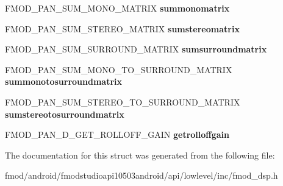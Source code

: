 \begin{DoxyCompactItemize}
\item 
\hypertarget{struct_f_m_o_d___d_s_p___s_t_a_t_e___p_a_n___c_a_l_l_b_a_c_k_s_a4374ff0e37febab077ced5562ed1fd0e}{F\+M\+O\+D\+\_\+\+P\+A\+N\+\_\+\+S\+U\+M\+\_\+\+M\+O\+N\+O\+\_\+\+M\+A\+T\+R\+I\+X {\bfseries summonomatrix}}\label{struct_f_m_o_d___d_s_p___s_t_a_t_e___p_a_n___c_a_l_l_b_a_c_k_s_a4374ff0e37febab077ced5562ed1fd0e}

\item 
\hypertarget{struct_f_m_o_d___d_s_p___s_t_a_t_e___p_a_n___c_a_l_l_b_a_c_k_s_a7c312689cc02bededfe55af6bf9e659b}{F\+M\+O\+D\+\_\+\+P\+A\+N\+\_\+\+S\+U\+M\+\_\+\+S\+T\+E\+R\+E\+O\+\_\+\+M\+A\+T\+R\+I\+X {\bfseries sumstereomatrix}}\label{struct_f_m_o_d___d_s_p___s_t_a_t_e___p_a_n___c_a_l_l_b_a_c_k_s_a7c312689cc02bededfe55af6bf9e659b}

\item 
\hypertarget{struct_f_m_o_d___d_s_p___s_t_a_t_e___p_a_n___c_a_l_l_b_a_c_k_s_a7bdde7169ce66b257d3150b7eb3847f8}{F\+M\+O\+D\+\_\+\+P\+A\+N\+\_\+\+S\+U\+M\+\_\+\+S\+U\+R\+R\+O\+U\+N\+D\+\_\+\+M\+A\+T\+R\+I\+X {\bfseries sumsurroundmatrix}}\label{struct_f_m_o_d___d_s_p___s_t_a_t_e___p_a_n___c_a_l_l_b_a_c_k_s_a7bdde7169ce66b257d3150b7eb3847f8}

\item 
\hypertarget{struct_f_m_o_d___d_s_p___s_t_a_t_e___p_a_n___c_a_l_l_b_a_c_k_s_afaed136e2108c6fde84bac606e9c66d8}{F\+M\+O\+D\+\_\+\+P\+A\+N\+\_\+\+S\+U\+M\+\_\+\+M\+O\+N\+O\+\_\+\+T\+O\+\_\+\+S\+U\+R\+R\+O\+U\+N\+D\+\_\+\+M\+A\+T\+R\+I\+X {\bfseries summonotosurroundmatrix}}\label{struct_f_m_o_d___d_s_p___s_t_a_t_e___p_a_n___c_a_l_l_b_a_c_k_s_afaed136e2108c6fde84bac606e9c66d8}

\item 
\hypertarget{struct_f_m_o_d___d_s_p___s_t_a_t_e___p_a_n___c_a_l_l_b_a_c_k_s_ab1858d5a0fa804e24a62363d0236d44a}{F\+M\+O\+D\+\_\+\+P\+A\+N\+\_\+\+S\+U\+M\+\_\+\+S\+T\+E\+R\+E\+O\+\_\+\+T\+O\+\_\+\+S\+U\+R\+R\+O\+U\+N\+D\+\_\+\+M\+A\+T\+R\+I\+X {\bfseries sumstereotosurroundmatrix}}\label{struct_f_m_o_d___d_s_p___s_t_a_t_e___p_a_n___c_a_l_l_b_a_c_k_s_ab1858d5a0fa804e24a62363d0236d44a}

\item 
\hypertarget{struct_f_m_o_d___d_s_p___s_t_a_t_e___p_a_n___c_a_l_l_b_a_c_k_s_aadca44a7b30494bba1722fd0d4d7c78a}{F\+M\+O\+D\+\_\+\+P\+A\+N\+\_\+D\+\_\+\+G\+E\+T\+\_\+\+R\+O\+L\+L\+O\+F\+F\+\_\+\+G\+A\+I\+N {\bfseries getrolloffgain}}\label{struct_f_m_o_d___d_s_p___s_t_a_t_e___p_a_n___c_a_l_l_b_a_c_k_s_aadca44a7b30494bba1722fd0d4d7c78a}

\end{DoxyCompactItemize}


The documentation for this struct was generated from the following file\+:\begin{DoxyCompactItemize}
\item 
fmod/android/fmodstudioapi10503android/api/lowlevel/inc/fmod\+\_\+dsp.\+h\end{DoxyCompactItemize}
